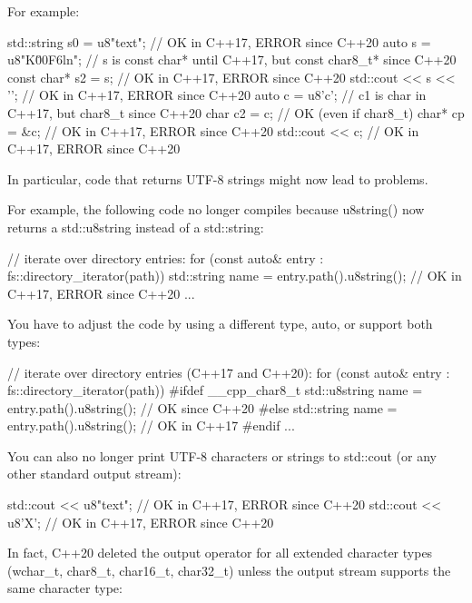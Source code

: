 
For example:

\begin{cpp}
std::string s0 = u8"text"; // OK in C++17, ERROR since C++20
auto s = u8"K\u00F6ln"; // s is const char* until C++17, but const char8_t* since C++20
const char* s2 = s; // OK in C++17, ERROR since C++20
std::cout << s << '\n'; // OK in C++17, ERROR since C++20
auto c = u8'c'; // c1 is char in C++17, but char8_t since C++20
char c2 = c; // OK (even if char8_t)
char* cp = &c; // OK in C++17, ERROR since C++20
std::cout << c; // OK in C++17, ERROR since C++20
\end{cpp}



In particular, code that returns UTF-8 strings might now lead to problems.

For example, the following code no longer compiles because u8string() now returns a std::u8string instead of a std::string:

\begin{cpp}
// iterate over directory entries:
for (const auto& entry : fs::directory_iterator(path)) {
	std::string name = entry.path().u8string(); // OK in C++17, ERROR since C++20
	...
}
\end{cpp}

You have to adjust the code by using a different type, auto, or support both types:

\begin{cpp}
// iterate over directory entries (C++17 and C++20):
for (const auto& entry : fs::directory_iterator(path)) {
#ifdef __cpp_char8_t
	std::u8string name = entry.path().u8string(); // OK since C++20
#else
	std::string name = entry.path().u8string(); // OK in C++17
#endif
	...
}
\end{cpp}


You can also no longer print UTF-8 characters or strings to std::cout (or any other standard output stream):

\begin{cpp}
std::cout << u8"text"; // OK in C++17, ERROR since C++20
std::cout << u8'X'; // OK in C++17, ERROR since C++20
\end{cpp}

In fact, C++20 deleted the output operator for all extended character types (wchar\_t, char8\_t, char16\_t, char32\_t) unless the output stream supports the same character type:

